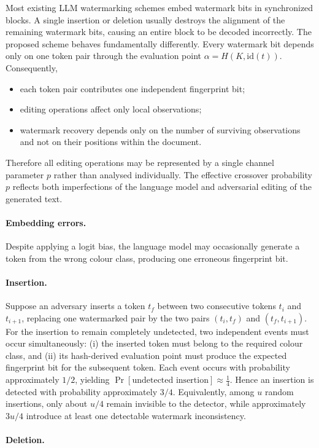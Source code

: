 \documentclass[a4paper,11pt]{llncs}
\begin{document}
Most existing LLM watermarking schemes embed watermark bits in
synchronized blocks. A single insertion or deletion usually destroys the
alignment of the remaining watermark bits, causing an entire block to be
decoded incorrectly.
The proposed scheme behaves fundamentally differently. Every watermark
bit depends only on one token pair through the evaluation point
$\alpha=H(K,\mathrm{id}(t))$. Consequently,
%
\begin{itemize}
\item each token pair contributes one independent fingerprint bit;
\item editing operations affect only local observations;
\item watermark recovery depends only on the number of surviving
observations and not on their positions within the document.
\end{itemize}
%
Therefore all editing operations may be represented by a single channel
parameter $p$ rather than analysed individually.
The effective crossover probability $p$ reflects both imperfections of
the language model and adversarial editing of the generated text.

\paragraph{Embedding errors.}
%
Despite applying a logit bias, the language model may occasionally
generate a token from the wrong colour class, producing one erroneous
fingerprint bit.
%
\paragraph{Insertion.}
Suppose an adversary inserts a token $t_f$ between two consecutive tokens
$t_i$ and $t_{i+1}$, replacing one watermarked pair by the two pairs
$(t_i,t_f)$ and $(t_f,t_{i+1})$. For the insertion to remain completely
undetected, two independent events must occur simultaneously: (i) the
inserted token must belong to the required colour class, and (ii) its
hash-derived evaluation point must produce the expected fingerprint bit
for the subsequent token. Each event occurs with probability
approximately $1/2$, yielding
$\Pr[\text{undetected insertion}]
\approx
\frac14.$
Hence an insertion is detected with probability approximately
$3/4$. Equivalently, among $u$ random insertions, only about $u/4$
remain invisible to the detector, while approximately $3u/4$ introduce
at least one detectable watermark inconsistency.

\paragraph{Deletion.}
\end{document}
